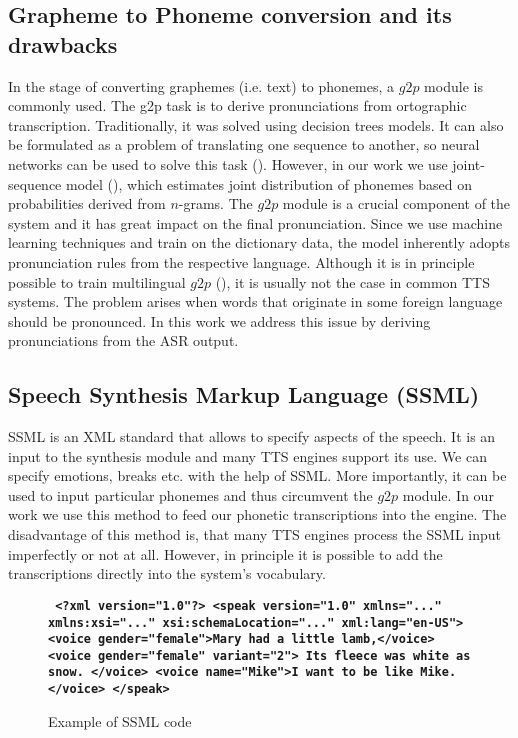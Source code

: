 \subsection*{Grapheme to Phoneme conversion and its drawbacks}
\label{g2p-desc}
In the stage of converting graphemes (i.e. text) to phonemes, a $g2p$ module is commonly used.
The g2p task is to derive pronunciations from ortographic transcription.
Traditionally, it was solved using decision trees models.
It can also be formulated as a problem of translating one sequence to another, so neural networks can be used to solve this task (\cite{yao2015sequence}).
However, in our work we use joint-sequence model (\cite{bisani2008joint}), which estimates joint distribution of phonemes based on probabilities derived from $n$-grams.
The $g2p$ module is a crucial component of the system and it has great impact on the final pronunciation.
Since we use machine learning techniques and train on the dictionary data, the model inherently adopts pronunciation rules from the respective language.
Although it is in principle possible to  train multilingual $g2p$ (\cite{schlippe2012grapheme}), it is usually not the case in common TTS systems.
The problem arises when words that originate in some foreign language should be pronounced.
In this work we address this issue by deriving pronunciations from the ASR output.
\subsection*{Speech Synthesis Markup Language (SSML)}
\cite{taylor1997ssml}
SSML is an XML standard that allows to specify aspects of the speech.
It is an input to the synthesis module and many TTS engines support its use.
We can specify emotions, breaks etc. with the help of SSML.
More importantly, it can be used to input particular phonemes and thus circumvent the $g2p$ module.
In our work we use this method to feed our phonetic transcriptions into the engine.
The disadvantage of this method is, that many TTS engines process the SSML input imperfectly or not at all.
However, in principle it is possible to add the transcriptions directly into the system's vocabulary.
\begin{center}
\begin{figure}
\textbf{\texttt{
<?xml version="1.0"?>
<speak version="1.0" xmlns="..."
         xmlns:xsi="..."
         xsi:schemaLocation="..."
         xml:lang="en-US">\linebreak
  \tab <voice gender="female">Mary had a little lamb,</voice>\linebreak
  \tab <voice gender="female" variant="2">\linebreak
  \tab\tab Its fleece was white as snow.\linebreak
  \tab</voice>\linebreak
  \tab<voice name="Mike">I want to be like Mike.</voice>\linebreak
</speak>
}}
\label{ssml_example}
\caption{Example of SSML code}
\end{figure}
\end{center}

